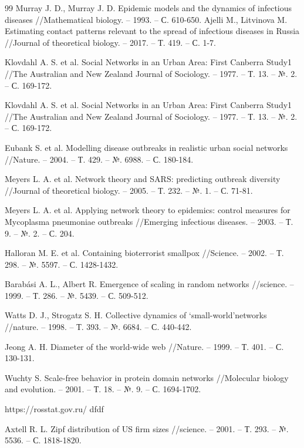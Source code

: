 \documentclass[14pt,a4paper]{article}
\begin{document}
\begin{thebibliography}{99}
	 Murray J. D., Murray J. D. Epidemic models and the dynamics of infectious diseases //Mathematical biology. – 1993. – С. 610-650.
	 Ajelli M., Litvinova M. Estimating contact patterns relevant to the spread of infectious diseases in Russia //Journal of theoretical biology. – 2017. – Т. 419. – С. 1-7.
	
	 Klovdahl A. S. et al. Social Networks in an Urban Area: First Canberra Study1 //The Australian and New Zealand Journal of Sociology. – 1977. – Т. 13. – №. 2. – С. 169-172.
	
	 Klovdahl A. S. et al. Social Networks in an Urban Area: First Canberra Study1 //The Australian and New Zealand Journal of Sociology. – 1977. – Т. 13. – №. 2. – С. 169-172.
	
	 Eubank S. et al. Modelling disease outbreaks in realistic urban social networks //Nature. – 2004. – Т. 429. – №. 6988. – С. 180-184.
	
	 Meyers L. A. et al. Network theory and SARS: predicting outbreak diversity //Journal of theoretical biology. – 2005. – Т. 232. – №. 1. – С. 71-81.
	
	 Meyers L. A. et al. Applying network theory to epidemics: control measures for Mycoplasma pneumoniae outbreaks //Emerging infectious diseases. – 2003. – Т. 9. – №. 2. – С. 204.
	
	 Halloran M. E. et al. Containing bioterrorist smallpox //Science. – 2002. – Т. 298. – №. 5597. – С. 1428-1432.
	
	 Barabási A. L., Albert R. Emergence of scaling in random networks //science. – 1999. – Т. 286. – №. 5439. – С. 509-512.
	
		Watts D. J., Strogatz S. H. Collective dynamics of ‘small-world’networks //nature. – 1998. – Т. 393. – №. 6684. – С. 440-442.
	
	 Jeong A. H. Diameter of the world-wide web //Nature. – 1999. – Т. 401. – С. 130-131.
	
	Wuchty S. Scale-free behavior in protein domain networks //Molecular biology and evolution. – 2001. – Т. 18. – №. 9. – С. 1694-1702.
	
	 https://rosstat.gov.ru/
	 dfdf
	
	 Axtell R. L. Zipf distribution of US firm sizes //science. – 2001. – Т. 293. – №. 5536. – С. 1818-1820.
	

\end{thebibliography}
\end{document}
